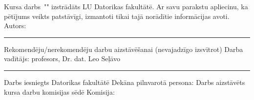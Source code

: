\documentclass[12pt]{report}%
\theoremstyle{definition}
\def\degree{Kursa darbs}
\def\supervisor{Darba vadītājs: profesors, Dr. dat. Leo Seļāvo}
\begin{document}
\newpage
\thispagestyle{empty}
\makeatletter
{
\noindent
\degree \ "\@title" izstrādāts LU Datorikas fakultātē.
\newline
\newline
\noindent
Ar savu parakstu apliecinu, ka pētījums veikts patstāvīgi, izmantoti tikai tajā norādītie informācijas avoti.
\newline
\newline
\noindent
Autors: \@author \space \rule{30mm}{0.2mm}
\newline
\newline
\newline
\noindent
Rekomendēju/nerekomendēju darbu aizstāvēšanai (nevajadzīgo izsvītrot)
\newline
\newline
\noindent 
\supervisor \space \rule{30mm}{0.2mm}
\newline
\newline
\newline
\newline
\newline
\noindent 
Darbs iesniegts Datorikas fakultātē
\newline
\newline
\noindent 
Dekāna pilnvarotā persona:
\newline
\newline
\newline
\newline
\noindent 
Darbs aizstāvēts kursa darbu komisijas sēdē
\newline
\newline
\newline
\newline
\newline
\noindent 
Komisija:
}
\makeatother
\end{document}
